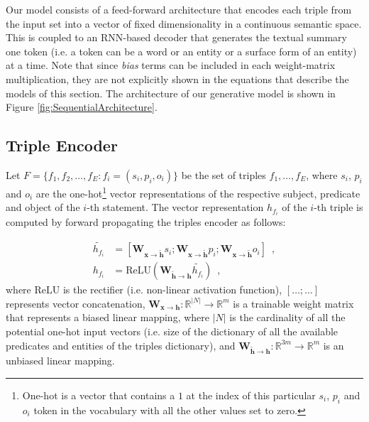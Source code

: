 \documentclass[preprint,5p]{elsarticle}
\begin{document}
Our model consists of a feed-forward architecture that encodes each triple from the input set into a vector of fixed dimensionality in a continuous semantic space. This is coupled to an RNN-based decoder that generates the textual summary one token (i.e. a token can be a word or an entity or a surface form of an entity) at a time. Note that since \textit{bias} terms can be included in each weight-matrix multiplication, they are not explicitly shown in the equations that describe the models of this section. The architecture of our generative model is shown in Figure \ref{fig:SequentialArchitecture}.






\subsection{Triple Encoder}

Let $F = \{f_1,f_2, \ldots, f_E: f_i=(s_i,p_i,o_i)\}$ be the set of triples $f_1, \ldots, f_E$, where $s_i$, $p_i$ and $o_i$ are the one-hot\footnote{One-hot is a vector that contains a $1$ at the index of this particular $s_i$, $p_i$ and $o_i$ token in the vocabulary with all the other values set to zero.} vector representations of the respective subject, predicate and object of the $i$-th statement. The vector representation $h_{f_i}$ of the $i$-th triple is computed by forward propagating the triples encoder as follows:

\begin{align}
  \widetilde{h_{f_i}} & =  [\mathbf{W_{x \rightarrow \widetilde{h}}}s_i;\mathbf{W_{x \rightarrow \widetilde{h}}}p_i;\mathbf{W_{x \rightarrow \widetilde{h}}}o_i] \enspace, \\
  h_{f_i} & = \text{ReLU}(\mathbf{W_{\widetilde{h} \rightarrow h}}\widetilde{h_{f_i}}) \enspace,
\end{align} where $\text{ReLU}$ is the rectifier (i.e. non-linear activation function), $[\ldots;\ldots]$ represents vector concatenation, $\mathbf{W_{x \rightarrow h}}:\mathbb{R}^{|N|} \rightarrow \mathbb{R}^m$ is a trainable weight matrix that represents a biased linear mapping, where $|N|$ is the cardinality of all the potential one-hot input vectors (i.e. size of the dictionary of all the available predicates and entities of the triples dictionary), and $\mathbf{W_{\widetilde{h} \rightarrow h}}:\mathbb{R}^{3m} \rightarrow \mathbb{R}^m$ is an unbiased linear mapping.
\end{document}
